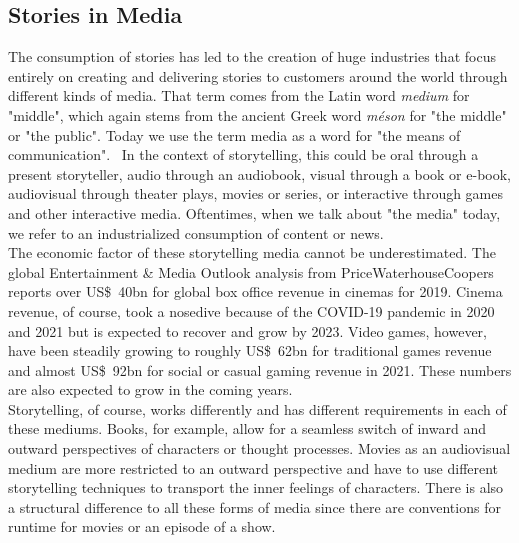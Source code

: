 \subsection{Stories in Media}
The consumption of stories has led to the creation of huge industries that focus entirely on creating and delivering stories to customers around the world through different kinds of media. That term comes from the Latin word \textit{medium} for "middle", which again stems from the ancient Greek word \textit{méson} for "the middle" or "the public". Today we use the term media as a word for "the means of communication".~\cite{Hoffmann2000} In the context of storytelling, this could be oral through a present storyteller, audio through an audiobook, visual through a book or e-book, audiovisual through theater plays, movies or series, or interactive through games and other interactive media. Oftentimes, when we talk about "the media" today, we refer to an industrialized consumption of content or news.\\
The economic factor of these storytelling media cannot be underestimated. The global Entertainment \& Media Outlook analysis from PriceWaterhouseCoopers reports over US\$~40bn for global box office revenue in cinemas for 2019. Cinema revenue, of course, took a nosedive because of the COVID-19 pandemic in 2020 and 2021 but is expected to recover and grow by 2023. Video games, however, have been steadily growing to roughly US\$~62bn for traditional games revenue and almost US\$~92bn for social or casual gaming revenue in 2021. These numbers are also expected to grow in the coming years.~\cite{PwC2021}\\
Storytelling, of course, works differently and has different requirements in each of these mediums. Books, for example, allow for a seamless switch of inward and outward perspectives of characters or thought processes. Movies as an audiovisual medium are more restricted to an outward perspective and have to use different storytelling techniques to transport the inner feelings of characters. There is also a structural difference to all these forms of media since there are conventions for runtime for movies or an episode of a  show.~\cite{Ryan2004}\\
